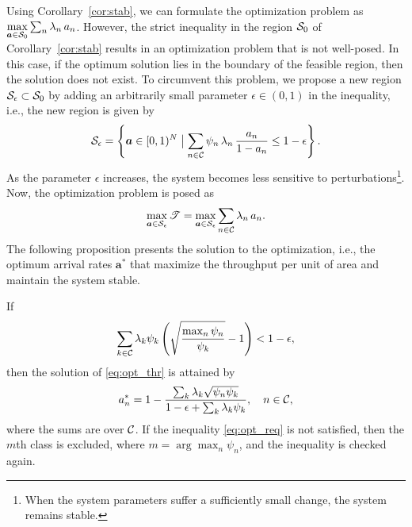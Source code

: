 Using Corollary~\ref{cor:stab}, we can formulate the optimization problem as
${\displaystyle\max_{\bm{a}\in\cal{S}_0}} \sum_{n} \lambda_n\,a_n$.
%
However, the strict inequality in the region $\cal{S}_0$ of Corollary~\ref{cor:stab} results in an optimization problem that is not well-posed. In this case, if the optimum solution lies in the boundary of the feasible region, then the solution does not exist.
%
To circumvent this problem, we propose a new region $\cal{S}_\epsilon\subset\cal{S}_0$ by adding an arbitrarily small parameter $\epsilon \in (0,1)$ in the inequality, i.e., the new region is given by
\begin{equation*}
	\cal{S}_{\epsilon} = \left\lbrace \bm{a}\in[0,1)^N \bigm\vert \sum_{n\in\cal{C}} \psi_n\,\lambda_n\,\dfrac{a_n}{1-a_n} \le 1-\epsilon \right\rbrace.
\end{equation*}
%
As the parameter $\epsilon$ increases, the system becomes less sensitive to perturbations\footnote{When the system parameters suffer a sufficiently small change, the system remains stable.}.
Now, the optimization problem is posed as
\begin{equation} \label{eq:opt_thr}
	\max_{\bm{a}\in\cal{S}_\epsilon} \mathscr{T} = \max_{\bm{a}\in\cal{S}_\epsilon} \sum_{n\in\cal{C}} \lambda_n\,a_n.
\end{equation}
%
The following proposition presents the solution to the optimization, i.e., the optimum arrival rates $\bm{a}^*$ that maximize the throughput per unit of area and maintain the system stable.

\begin{proposition} \label{prop:eps}
	If 
    \begin{equation} \label{eq:opt_req}
		\sum_{k\in\cal{C}}\lambda_k\psi_k\left(\sqrt{\frac{\max_n \psi_n}{\psi_k}}-1\right)<1-\epsilon,
	\end{equation} then the solution of \eqref{eq:opt_thr} is attained by
    \begin{equation}
    	a_n^* = 1 - \frac{\sum_k \lambda_k \sqrt{\psi_n\psi_k}}{1-\epsilon+\sum_k\lambda_k\psi_k}, \quad n\in\cal{C},
    \end{equation}
    where the sums are over $\cal{C}$. If the inequality \eqref{eq:opt_req} is not satisfied, then the $m$th class is excluded, where $m = \arg\max_n \psi_n$, and the inequality is checked again.
\end{proposition}

